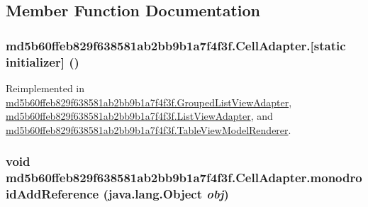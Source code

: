 \subsection{Member Function Documentation}
\hypertarget{classmd5b60ffeb829f638581ab2bb9b1a7f4f3f_1_1_cell_adapter_c7c95358c7dafe01adfe68203283f13b}{
\subsubsection[{[static initializer]}]{\setlength{\rightskip}{0pt plus 5cm}md5b60ffeb829f638581ab2bb9b1a7f4f3f.CellAdapter.\mbox{[}static initializer\mbox{]} ()}}
\label{classmd5b60ffeb829f638581ab2bb9b1a7f4f3f_1_1_cell_adapter_c7c95358c7dafe01adfe68203283f13b}




Reimplemented in \hyperlink{classmd5b60ffeb829f638581ab2bb9b1a7f4f3f_1_1_grouped_list_view_adapter_fe703df4896b7de21a64f688845fb595}{md5b60ffeb829f638581ab2bb9b1a7f4f3f.GroupedListViewAdapter}, \hyperlink{classmd5b60ffeb829f638581ab2bb9b1a7f4f3f_1_1_list_view_adapter_95ad609e7ba116f4309bf26405bbcd43}{md5b60ffeb829f638581ab2bb9b1a7f4f3f.ListViewAdapter}, and \hyperlink{classmd5b60ffeb829f638581ab2bb9b1a7f4f3f_1_1_table_view_model_renderer_887500bdde9d4ca81abdca920c56087c}{md5b60ffeb829f638581ab2bb9b1a7f4f3f.TableViewModelRenderer}.\hypertarget{classmd5b60ffeb829f638581ab2bb9b1a7f4f3f_1_1_cell_adapter_59b12b00e8c034309892498bbef078d4}{
\subsubsection[{monodroidAddReference}]{\setlength{\rightskip}{0pt plus 5cm}void md5b60ffeb829f638581ab2bb9b1a7f4f3f.CellAdapter.monodroidAddReference (java.lang.Object {\em obj})}}
\label{classmd5b60ffeb829f638581ab2bb9b1a7f4f3f_1_1_cell_adapter_59b12b00e8c034309892498bbef078d4}




